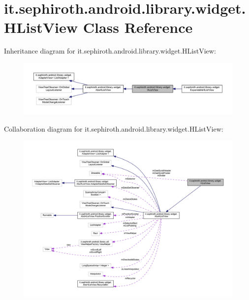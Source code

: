 \hypertarget{classit_1_1sephiroth_1_1android_1_1library_1_1widget_1_1_h_list_view}{}\section{it.\+sephiroth.\+android.\+library.\+widget.\+H\+List\+View Class Reference}
\label{classit_1_1sephiroth_1_1android_1_1library_1_1widget_1_1_h_list_view}


Inheritance diagram for it.\+sephiroth.\+android.\+library.\+widget.\+H\+List\+View\+:
\nopagebreak
\begin{figure}[H]
\begin{center}
\leavevmode
\includegraphics[width=350pt]{classit_1_1sephiroth_1_1android_1_1library_1_1widget_1_1_h_list_view__inherit__graph}
\end{center}
\end{figure}


Collaboration diagram for it.\+sephiroth.\+android.\+library.\+widget.\+H\+List\+View\+:
\nopagebreak
\begin{figure}[H]
\begin{center}
\leavevmode
\includegraphics[width=350pt]{classit_1_1sephiroth_1_1android_1_1library_1_1widget_1_1_h_list_view__coll__graph}
\end{center}
\end{figure}
